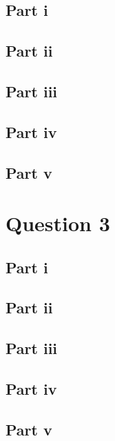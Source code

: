\documentclass[11pt]{article} %
\begin{document}
\subsection{Part i}
\subsection{Part ii}
\subsection{Part iii}
\subsection{Part iv}
\subsection{Part v}
\section{Question 3}
\subsection{Part i}
\subsection{Part ii}
\subsection{Part iii}
\subsection{Part iv}
\subsection{Part v}
\end{document}
